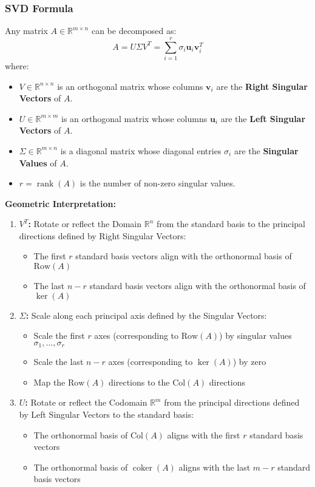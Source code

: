 \documentclass{article}
\begin{document}
\subsubsection{SVD Formula}
Any matrix $A \in \mathbb{R}^{m \times n}$ can be decomposed as:
\[
    A = U \Sigma V^T = \sum_{i=1}^{r} \sigma_i \mathbf{u}_i \mathbf{v}_i^T
\]
where:
\begin{itemize}
    \item $V \in \mathbb{R}^{n \times n}$ is an orthogonal matrix whose columns $\mathbf{v}_i$ are the \textbf{Right Singular Vectors} of $A$.
    \item $U \in \mathbb{R}^{m \times m}$ is an orthogonal matrix whose columns $\mathbf{u}_i$ are the \textbf{Left Singular Vectors} of $A$.
    \item $\Sigma \in \mathbb{R}^{m \times n}$ is a diagonal matrix whose diagonal entries $\sigma_i$ are the \textbf{Singular Values} of $A$.
    \item $r = \operatorname{rank}(A)$ is the number of non-zero singular values.
\end{itemize}
\newline
\textbf{Geometric Interpretation:}
\begin{enumerate}
    \item \textbf{$V^T$:} Rotate or reflect the Domain $\mathbb{R}^n$ from the standard basis to the principal directions defined by Right Singular Vectors:
    \begin{itemize}
        \item The first $r$ standard basis vectors align with the orthonormal basis of $\text{Row}(A)$
        \item The last $n-r$ standard basis vectors align with the orthonormal basis of $\ker(A)$
    \end{itemize}

    \item \textbf{$\Sigma$:} Scale along each principal axis defined by the Singular Vectors:
    \begin{itemize}
        \item Scale the first $r$ axes (corresponding to $\text{Row}(A)$) by singular values $\sigma_1, \ldots, \sigma_r$
        \item Scale the last $n-r$ axes (corresponding to $\ker(A)$) by zero
        \item Map the $\text{Row}(A)$ directions to the $\text{Col}(A)$ directions
    \end{itemize}

    \item \textbf{$U$:} Rotate or reflect the Codomain $\mathbb{R}^m$ from the principal directions defined by Left Singular Vectors to the standard basis:
    \begin{itemize}
        \item The orthonormal basis of $\text{Col}(A)$ aligns with the first $r$ standard basis vectors
        \item The orthonormal basis of $\operatorname{coker}(A)$ aligns with the last $m-r$ standard basis vectors
    \end{itemize}
\end{enumerate}
\end{document}
